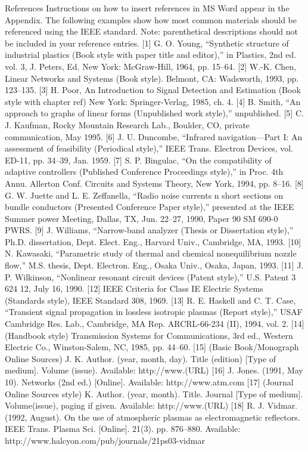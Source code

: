 References
Instructions on how to insert references in MS Word appear in the Appendix.  The following examples show how most common materials should be referenced using the IEEE standard. Note: parenthetical descriptions should not be included in your reference entries.
    [1] G. O. Young, “Synthetic structure of industrial plastics (Book style with paper title and editor),” in Plastics, 2nd ed. vol. 3, J. Peters, Ed.  New York: McGraw-Hill, 1964, pp. 15–64.
    [2] W.-K. Chen, Linear Networks and Systems (Book style). Belmont, CA: Wadsworth, 1993, pp. 123–135.
    [3] H. Poor, An Introduction to Signal Detection and Estimation (Book style with chapter ref)   New York: Springer-Verlag, 1985, ch. 4.
    [4] B. Smith, “An approach to graphs of linear forms (Unpublished work style),” unpublished.
    [5] C. J. Kaufman, Rocky Mountain Research Lab., Boulder, CO, private communication, May 1995.
    [6] J. U. Duncombe, “Infrared navigation—Part I: An assessment of feasibility (Periodical style),” IEEE Trans. Electron Devices, vol. ED-11, pp. 34–39, Jan. 1959.
    [7] S. P. Bingulac, “On the compatibility of adaptive controllers (Published Conference Proceedings style),” in Proc. 4th Annu. Allerton Conf. Circuits and Systems Theory, New York, 1994, pp. 8–16.
    [8] G. W. Juette and L. E. Zeffanella, “Radio noise currents n short sections on bundle conductors (Presented Conference Paper style),” presented at the IEEE Summer power Meeting, Dallas, TX, Jun. 22–27, 1990, Paper 90 SM 690-0 PWRS.
    [9] J. Williams, “Narrow-band analyzer (Thesis or Dissertation style),” Ph.D. dissertation, Dept. Elect. Eng., Harvard Univ., Cambridge, MA, 1993. 
    [10] N. Kawasaki, “Parametric study of thermal and chemical nonequilibrium nozzle flow,” M.S. thesis, Dept. Electron. Eng., Osaka Univ., Osaka, Japan, 1993.
    [11] J. P. Wilkinson, “Nonlinear resonant circuit devices (Patent style),” U.S. Patent 3 624 12, July 16, 1990. 
    [12] IEEE Criteria for Class IE Electric Systems (Standards style), IEEE Standard 308, 1969.
    [13] R. E. Haskell and C. T. Case, “Transient signal propagation in lossless isotropic plasmas (Report style),” USAF Cambridge Res. Lab., Cambridge, MA Rep. ARCRL-66-234 (II), 1994, vol. 2.
    [14] (Handbook style) Transmission Systems for Communications, 3rd ed., Western Electric Co., Winston-Salem, NC, 1985, pp. 44–60.
    [15]  (Basic Book/Monograph Online Sources) J. K. Author. (year, month, day). Title (edition) [Type of medium]. Volume (issue).	 Available: http://www.(URL)
    [16] J. Jones. (1991, May 10). Networks (2nd ed.) [Online]. Available: http://www.atm.com
    [17] (Journal Online Sources style) K. Author. (year, month). Title. Journal [Type of medium]. Volume(issue), paging if given.	  Available: http://www.(URL)
    [18] R. J. Vidmar. (1992, August). On the use of atmospheric plasmas as electromagnetic reflectors. IEEE Trans. Plasma Sci. [Online]. 21(3). pp. 876–880.   Available: http://www.halcyon.com/pub/journals/21ps03-vidmar


